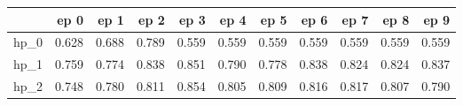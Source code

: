 \begin{tabular}{lrrrrrrrrrr}
\toprule
{} &   ep 0 &   ep 1 &   ep 2 &   ep 3 &   ep 4 &   ep 5 &   ep 6 &   ep 7 &   ep 8 &   ep 9 \\
\midrule
hp\_0 &  0.628 &  0.688 &  0.789 &  0.559 &  0.559 &  0.559 &  0.559 &  0.559 &  0.559 &  0.559 \\
hp\_1 &  0.759 &  0.774 &  0.838 &  0.851 &  0.790 &  0.778 &  0.838 &  0.824 &  0.824 &  0.837 \\
hp\_2 &  0.748 &  0.780 &  0.811 &  0.854 &  0.805 &  0.809 &  0.816 &  0.817 &  0.807 &  0.790 \\
\bottomrule
\end{tabular}
